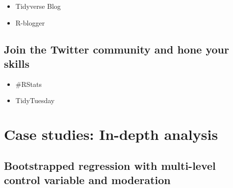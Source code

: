 \documentclass[
]{book}
\providecommand{\tightlist}{%
  \setlength{\itemsep}{0pt}\setlength{\parskip}{0pt}}
\begin{document}
\begin{itemize}
\tightlist
\item
  Tidyverse Blog
\item
  R-blogger
\end{itemize}

\hypertarget{next-steps-twitter}{%
\section{Join the Twitter community and hone your skills}\label{next-steps-twitter}}

\begin{itemize}
\tightlist
\item
  \#RStats
\item
  TidyTuesday
\end{itemize}

\hypertarget{case-studies-in-depth-analysis}{%
\chapter{Case studies: In-depth analysis}\label{case-studies-in-depth-analysis}}

\hypertarget{bootstrapped-regression}{%
\section{Bootstrapped regression with multi-level control variable and moderation}\label{bootstrapped-regression}}
\end{document}
